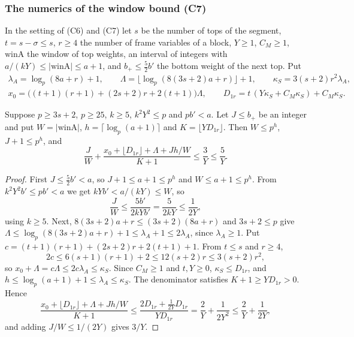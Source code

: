 
\subsubsection{The numerics of the window bound (C7)}\label{w1:sec:C7}

In the setting of (C6) and (C7) let $s$ be the number of tops of the segment, $t=s-\sigma\le s$, $r\ge4$ the number of frame variables of a block, $Y\ge1$, $C_M\ge1$, $\mathrm{winA}$ the window of top weights, an interval of integers with $a/(kY)\le\lvert\mathrm{winA}\rvert\le a+1$, and $b_+\le\frac52b'$ the bottom weight of the next top. Put
\begin{gather*}
\lambda_A=\log_p(8a+r)+1,\qquad\Lambda=\lfloor\log_p(8(3s+2)a+r)\rfloor+1,\qquad\kappa_S=3(s+2)r^2\lambda_A,\\
x_0=\big((t+1)(r+1)+(2s+2)r+2(t+1)\big)\Lambda,\qquad D_{1r}=t\,(Y\kappa_S+C_M\kappa_S)+C_M\kappa_S .
\end{gather*}

\begin{proposition}\label{w1:prop:C7}
Suppose $p\ge3s+2$, $p\ge25$, $k\ge5$, $k^2Y^2\le p$ and $pb'<a$. Let $J\le b_+$ be an integer and put $W=\lvert\mathrm{winA}\rvert$, $h=\lceil\log_p(a+1)\rceil$ and $K=\lfloor YD_{1r}\rfloor$. Then $W\le p^h$, $J+1\le p^h$, and
\[
\frac JW+\frac{x_0+\lfloor D_{1r}\rfloor+\Lambda+Jh/W}{K+1}\le\frac3Y\le\frac5Y .
\]
\end{proposition}

\begin{proof}
First $J\le\frac52b'<a$, so $J+1\le a+1\le p^h$ and $W\le a+1\le p^h$. From $k^2Y^2b'\le pb'<a$ we get $kYb'<a/(kY)\le W$, so
\[
\frac JW\le\frac{5b'}{2kYb'}=\frac5{2kY}\le\frac1{2Y},
\]
using $k\ge5$. Next, $8(3s+2)a+r\le(3s+2)(8a+r)$ and $3s+2\le p$ give $\Lambda\le\log_p(8(3s+2)a+r)+1\le\lambda_A+1\le2\lambda_A$, since $\lambda_A\ge1$. Put $c=(t+1)(r+1)+(2s+2)r+2(t+1)+1$. From $t\le s$ and $r\ge4$,
\[
2c\le6(s+1)(r+1)+2\le12(s+2)r\le3(s+2)r^2,
\]
so $x_0+\Lambda=c\Lambda\le2c\lambda_A\le\kappa_S$. Since $C_M\ge1$ and $t,Y\ge0$, $\kappa_S\le D_{1r}$, and $h\le\log_p(a+1)+1\le\lambda_A\le\kappa_S$. The denominator satisfies $K+1\ge YD_{1r}>0$. Hence
\[
\frac{x_0+\lfloor D_{1r}\rfloor+\Lambda+Jh/W}{K+1}\le\frac{2D_{1r}+\frac1{2Y}D_{1r}}{YD_{1r}}=\frac2Y+\frac1{2Y^2}\le\frac2Y+\frac1{2Y},
\]
and adding $J/W\le1/(2Y)$ gives $3/Y$.
\end{proof}

